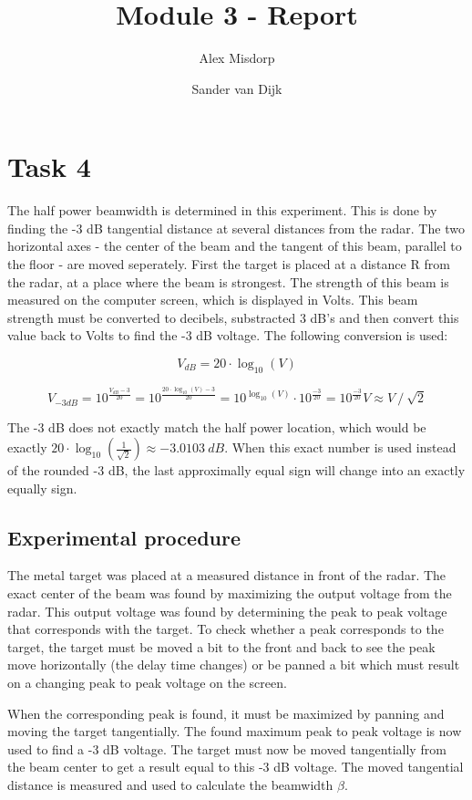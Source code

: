\documentclass[final]{scrreprt} %
\title{Module 3 - Report}
\author{Alex {Misdorp} \and Sander {van Dijk}}
\begin{document}
\chapter{Task 4}
The half power beamwidth is determined in this experiment. This is done by finding the -3 dB tangential distance at several distances from the radar. The two horizontal axes - the center of the beam and the tangent of this beam, parallel to the floor - are moved seperately. First the target is placed at a distance R from the radar, at a place where the beam is strongest. The strength of this beam is measured on the computer screen, which is displayed in Volts. This beam strength must be converted to decibels, substracted 3 dB's and then convert this value back to Volts to find the -3 dB voltage. The following conversion is used:

\begin{equation}
	V_{dB} = 20 \cdot \log_{10} (V)
\end{equation}

\begin{equation}
	V_{-3 dB} = 10^{\frac{V_{dB} - 3}{20}} = 10^{\frac{20 \cdot \log_{10}(V) - 3}{20}} = 10^{\log_{10}(V)} \cdot 10^{\frac{-3}{20}} = 10^{\frac{-3}{20}} V \approx V~/~\sqrt{2}
\end{equation}

The -3 dB does not exactly match the half power location, which would be exactly $20 \cdot \log_{10} (\frac{1}{\sqrt{2}}) \approx -3.0103~dB $. When this exact number is used instead of the rounded -3 dB, the last approximally equal sign will change into an exactly equally sign.

\section{Experimental procedure}
The metal target was placed at a measured distance in front of the radar. The exact center of the beam was found by maximizing the output voltage from the radar. This output voltage was found by determining the peak to peak voltage that corresponds with the target. To check whether a peak corresponds to the target, the target must be moved a bit to the front and back to see the peak move horizontally (the delay time changes) or be panned a bit which must result on a changing peak to peak voltage on the screen.

When the corresponding peak is found, it must be maximized by panning and moving the target tangentially. The found maximum peak to peak voltage is now used to find a -3 dB voltage. The target must now be moved tangentially from the beam center to get a result equal to this -3 dB voltage. The moved tangential distance is measured and used to calculate the beamwidth $\beta$.
\end{document}
